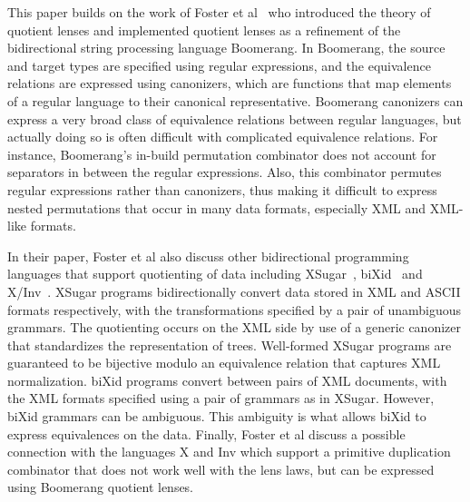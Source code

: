 \documentclass[acmsmall,review,anonymous]{acmart}
\newcommand{\FINISH}[3]{\ifdraft\textcolor{#1}{[#2: #3]}\fi}
\newcommand{\sam}[1]{\FINISH{dkpurple}{SM}{#1}}
\begin{document}

This paper builds on the work of Foster et al~\cite{quotientlenses} who
introduced the theory of quotient lenses and implemented quotient lenses as a
refinement of the bidirectional string processing language Boomerang.
In Boomerang, the source and target types are specified using regular
expressions, and the equivalence relations are expressed using canonizers, which
are functions that map elements of a regular language to their canonical
representative. Boomerang canonizers can express a very broad class of
equivalence relations between regular languages, but actually doing so is often
difficult with complicated equivalence relations. For instance, Boomerang's
in-build permutation combinator does not account for separators in between the
regular expressions. Also, this combinator permutes regular expressions rather
than canonizers, thus making it difficult to express nested permutations that
occur in many data formats, especially XML and XML-like formats.

In their paper, Foster et al also discuss other bidirectional programming
languages that support quotienting of data including XSugar~\cite{xsugar},
biXid~\cite{bixid} and X/Inv~\cite{Hu2004,Mu2004,Mu2006}. XSugar programs
bidirectionally convert data stored in XML and ASCII formats respectively, with the
transformations specified by a pair of unambiguous grammars. The quotienting
occurs on the XML side by use of a generic canonizer that standardizes the
representation of trees. Well-formed XSugar programs are guaranteed to be
bijective modulo an equivalence relation that captures XML normalization. biXid
programs convert between pairs of XML documents, with the XML formats specified
using a pair of grammars as in XSugar. However, biXid grammars can be ambiguous.
This ambiguity is what allows biXid to express equivalences on the data.
Finally, Foster et al discuss a possible connection with the languages
X and Inv which support a primitive duplication combinator that does not work
well with the lens laws, but can be expressed using Boomerang quotient lenses.
\end{document}
